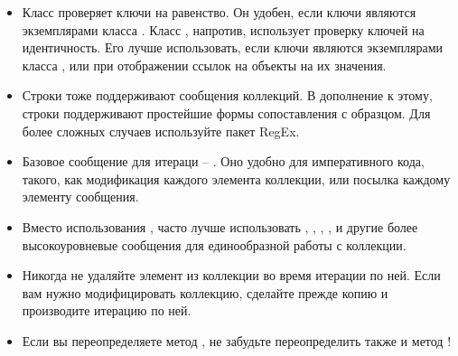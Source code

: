 \documentclass[a4paper,10pt,twoside]{book}
\begin{document}
\begin{itemize}
  \item Класс  проверяет ключи на равенство. Он удобен, если ключи являются экземплярами класса . Класс , напротив, использует проверку ключей на идентичность. Его лучше использовать, если ключи являются экземплярами класса , или при отображении ссылок на объекты на их значения.
  \item Строки тоже поддерживают сообщения коллекций. В дополнение к этому, строки поддерживают простейшие формы сопоставления с образцом. Для более сложных случаев используйте пакет RegEx.
  \item Базовое сообщение для итераци -- . Оно удобно для императивного кода, такого, как модификация каждого элемента коллекции, или посылка каждому элементу сообщения.
  \item Вместо использования , часто лучше использовать , , , ,  и другие более высокоуровневые сообщения для единообразной работы с коллекции.
  \item Никогда не удаляйте элемент из коллекции во время итерации по ней. Если вам нужно модифицировать коллекцию, сделайте прежде копию и производите итерацию по ней.
  \item Если вы переопределяете метод \ct{=}, не забудьте переопределить также и метод !
\end{itemize}

\ifx\wholebook\relax\else
   
   
\end{document}
